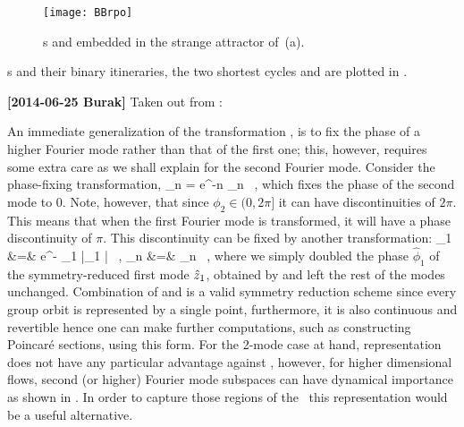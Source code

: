 

\begin{figure}%
  \begin{center}
  \texttt{[image: BBrpo]}
  \end{center}
  \caption{
	\Rpo s  and  embedded in the strange attractor
    of \,(a).
    }
  \label{fig:BBrpo1-01}
\end{figure}

\rpo s and their binary itineraries, the two shortest cycles
 and  are plotted in
. 
 
{\bf[2014-06-25 Burak]} Taken out from \label{s-mframes}:

An immediate generalization of the transformation ,
is to fix the phase of a higher Fourier mode rather than that of the first one; this, however, requires
some extra care as we shall explain for the second Fourier mode.
Consider the phase-fixing transformation,
\beq
	\sspRedC_n = e^{-\ii n } \sspC_n \, ,
	\label{e-2ndmodeTransform}
\eeq
which fixes the phase of the second mode to $0$. Note, however, that since
$\phi_2 \in (0, 2 \pi]$ it can have discontinuities of $2 \pi$. This means
that when the first Fourier mode is transformed, it will have a phase discontinuity
of $\pi$. This discontinuity can be fixed by another
transformation:
\bea
	\tilde{\sspC}_1 &=& e^{- \hat{\phi}_1} |\sspRedC_1 | \, , \continue
	\tilde{\sspC}_{n } &=& \sspRedC_n \, ,
	\label{e-PhaseDoubling}
\eea
where we simply doubled the phase $\hat{\phi}_1$ of the symmetry-reduced
first mode $\hat{z}_1$, obtained by  and left
the rest of the modes unchanged. Combination of 
and  is a valid symmetry reduction scheme since every
group orbit is represented by a single point, furthermore, it is also continuous
and revertible hence one can make further computations, such as constructing
Poincar\'{e} sections, using this form. For the 2-mode case at hand, representation
 does not have any particular advantage against
, however, for higher dimensional flows, second
(or higher) Fourier mode subspaces can have dynamical importance as shown in
. In order to capture those regions of the \statesp\ this
representation would be a useful alternative.

